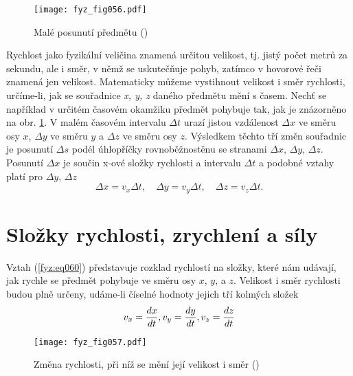    \begin{figure}[ht!]  %
      \centering
      \texttt{[image: fyz\_fig056.pdf]}
      \caption{Malé posunutí předmětu (\cite[s.~124]{Feynman01})}
      \label{fyz:fig056}
    \end{figure}
    
    Rychlost jako fyzikální veličina znamená určitou velikost, tj. jistý počet metrů za sekundu, 
    ale i směr, v němž se uskutečňuje pohyb, zatímco v hovorové řeči znamená jen velikost. 
    Matematicky můžeme vystihnout velikost i směr rychlosti, určíme-li, jak se souřadnice \emph{x, 
    y, z} daného předmětu mění s časem. Nechť se například v určitém časovém okamžiku předmět 
    pohybuje tak, jak je znázorněno na obr. \ref{fyz:fig056}. V malém časovém intervalu \(\Delta 
    t\) urazí jistou vzdálenost \(\Delta x\) ve směru osy \(x\), \(\Delta y\) ve směru \(y\) a 
    \(\Delta z\) ve směru osy \(z\). Výsledkem těchto tří změn souřadnic je posunutí \(\Delta s\) 
    podél úhlopříčky rovnoběžnostěnu se stranami \(\Delta x\), \(\Delta y\), \(\Delta z\). Posunutí 
    \(\Delta x\) je součin x-ové složky rychlosti a intervalu \(\Delta t\) a podobné vztahy platí 
    pro \(\Delta y\), \(\Delta z\)
    \begin{equation}\label{fyz:eq060}
      \Delta x = v_x\Delta t,\quad \Delta y = v_y\Delta t,\quad \Delta z = v_z\Delta t.
    \end{equation}
    
  \section{Složky rychlosti, zrychlení a síly}\label{fyz:IchapIXsecIII}
    Vztah (\ref{fyz:eq060}) představuje rozklad rychlostí na složky, které nám udávají, jak rychle 
    se předmět pohybuje ve směru osy \(x\), \(y\), a \(z\). Velikost i směr rychlosti budou plně 
    určeny, udáme-li číselné hodnoty jejich tří kolmých složek
    \begin{equation}\label{fyz:eq061}
      v_x = \dfrac{d x}{d t}, v_y = \dfrac{d y}{d t}, v_z = \dfrac{d z}{d t}
    \end{equation}

    \begin{figure}[ht!]  %
      \centering
      \texttt{[image: fyz\_fig057.pdf]}
      \caption{ Změna rychlosti, při níž se mění její velikost i směr (\cite[s.~125]{Feynman01})}
      \label{fyz:fig057}
    \end{figure}
    
